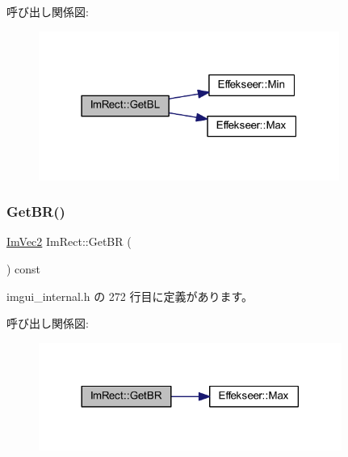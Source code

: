 呼び出し関係図\+:\nopagebreak
\begin{figure}[H]
\begin{center}
\leavevmode
\includegraphics[width=279pt]{struct_im_rect_a59d9751bc7be6745dddf5b83b9155669_cgraph}
\end{center}
\end{figure}
\mbox{\label{struct_im_rect_ad2f2687254beed5a9b19bde0d6fa14f5}} 
\subsubsection{\texorpdfstring{Get\+B\+R()}{GetBR()}}
{\footnotesize\ttfamily \mbox{\hyperlink{struct_im_vec2}{Im\+Vec2}} Im\+Rect\+::\+Get\+BR (\begin{DoxyParamCaption}{ }\end{DoxyParamCaption}) const\hspace{0.3cm}{\ttfamily [inline]}}



 imgui\+\_\+internal.\+h の 272 行目に定義があります。

呼び出し関係図\+:\nopagebreak
\begin{figure}[H]
\begin{center}
\leavevmode
\includegraphics[width=281pt]{struct_im_rect_ad2f2687254beed5a9b19bde0d6fa14f5_cgraph}
\end{center}
\end{figure}
\mbox{\label{struct_im_rect_aae13f8003184fd84f29d27c3c074cf43}} 
